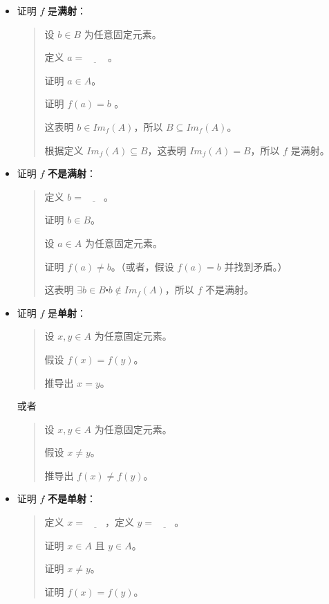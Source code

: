 \begin{itemize}
    \item 证明 $f$ 是\textbf{满射}：
          \begin{quote}
              设 $b \in B$ 为任意固定元素。

              定义 $a=\underline{\qquad}$ 。

              证明 $a \in A$。

              证明 $f(a) = b$ 。

              这表明 $b \in Im_f (A)$，所以 $B \subseteq Im_f (A)$。

              根据定义 $Im_f (A) \subseteq B$，这表明 $Im_f (A) = B$，所以 $f$ 是满射。
          \end{quote}
    \item 证明 $f$ \textbf{不是满射}：
          \begin{quote}
              定义 $b=\underline{\qquad}$。

              证明 $b \in B$。

              设 $a \in A$ 为任意固定元素。

              证明 $f(a) \ne b$。（或者，假设 $f(a) = b$ 并找到矛盾。）

              这表明 $\exists b \in B \centerdot b \notin Im_f (A)$，所以 $f$ 不是满射。
          \end{quote}
    \item 证明 $f$ 是\textbf{单射}：
          \begin{quote}
              设 $x,y \in A$ 为任意固定元素。

              假设 $f(x) = f(y)$。

              推导出 $x = y$。
          \end{quote}
          或者
          \begin{quote}
              设 $x,y \in A$ 为任意固定元素。

              假设 $x \ne y$。

              推导出 $f(x) \ne f(y)$。
          \end{quote}
    \item 证明 $f$ \textbf{不是单射}：
          \begin{quote}
              定义 $x=\underline{\qquad}$，定义 $y=\underline{\qquad}$。

              证明 $x \in A$ 且 $y \in A$。

              证明 $x \ne y$。

              证明 $f(x) = f(y)$。


\end{quote}
\end{itemize}
